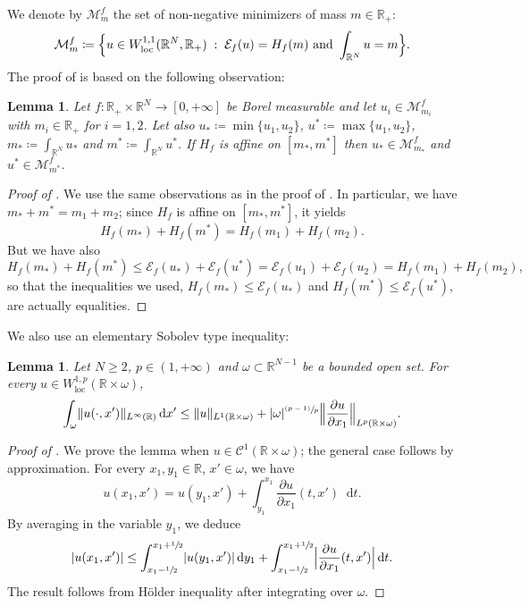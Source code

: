 \documentclass[JEP,XML,SOM,Unicode,published]{cedram}
\newcommand{\psfrac}[2]{{\sfrac{(#1)}{#2}}}
\newcommand{\Babs}[1]{\Bigl\vert#1\Bigr\vert}
\newcommand{\Bnorm}[1]{\Bigl\Vert#1\Bigr\Vert}
\theoremstyle{plain}
\newtheorem{lemma}[theorem]{Lemma}
\theoremstyle{definition}
\newcommand{\dd}{\mathop{}\mathopen{}\mathrm{d}}
\newcommand{\R}{\mathbb{R}}
\newcommand{\Cspace}{\mathscr{C}}
\newcommand{\ener}{\mathcal{E}}
\newcommand{\loc}{\mathrm{loc}}
\newcommand{\st}{\;:\;}
\DeclarePairedDelimiter{\abs}{\lvert}{\rvert}
\DeclarePairedDelimiter{\norm}{\lVert}{\rVert}
\begin{document}
We denote by \(\mathcal{M}^f_m\) the set of non-negative minimizers of mass \(m\in\R_+\):
\begin{equation}
\mathcal{M}^f_m\coloneqq \Bigl\{u\in W^{1,1}_\loc(\R^N,\R_+)\st \ener_f(u)=H_f(m)\text{ and }\int_{\R^N}u=m\Bigr\}.
\end{equation}
The proof of  is based on the following observation:
\begin{lemma}\label{lemmaOptimalitySupInf}
Let \(f:\R_+\times\R^N\to[0,+\infty]\) be Borel measurable and let \(u_i\in\mathcal{M}^f_{m_i}\) with \(m_i\in\R_+\) for \(i=1,2\). Let also \(u_\ast\coloneqq \min\{u_1,u_2\}\), \(u^\ast\coloneqq \max\{u_1,u_2\}\), \(m_\ast\coloneqq \int_{\R^N}u_\ast\) and \(m^\ast\coloneqq \int_{\R^N}u^\ast\). If \(H_f\) is affine on \([m_\ast,m^\ast]\) then \(u_\ast\in\mathcal{M}^f_{m_\ast}\) and \(u^\ast\in\mathcal{M}^f_{m^\ast}\).
\end{lemma}
\begin{proof}[Proof of ]
We use the same observations as in the proof of . In particular, we have \(m_\ast+m^\ast=m_1+m_2\); since \(H_f\) is affine on \([m_\ast,m^\ast]\), it yields
\[
H_f(m_\ast)+H_f(m^\ast)=H_f(m_1)+H_f(m_2).
\]
But we have also
\[
H_f(m_\ast)+H_f(m^\ast)\leq\ener_f(u_\ast)+\ener_f(u^\ast)=\ener_f(u_1)+\ener_f(u_2)=H_f(m_1)+H_f(m_2),
\]
so that the inequalities we used, \ie \(H_f(m_\ast)\leq\ener_f(u_\ast)\) and \(H_f(m^\ast)\leq\ener_f(u^\ast)\), are actually equalities.
\end{proof}
We also use an elementary Sobolev type inequality:
\begin{lemma}\label{lemmaSobolevInfinityLp}
Let \(N\geq 2\), \(p\in (1,+\infty)\) and \(\omega\subset\R^{N-1}\) be a bounded open set. For every \(u\in W_\loc^{1,p}(\R\times\omega)\),
\[
\int_\omega\norm{u(\cdot,x')}_{L^\infty(\R)}\dd x'\leq\norm{u}_{L^1(\R\times\omega)}+\abs{\omega}^{\psfrac{p-1}{p}}
\Bnorm{\frac{\partial u}{\partial x_1}}_{L^p(\R\times\omega)}.
\]
\end{lemma}
\begin{proof}[Proof of ]
We prove the lemma when \(u\in\Cspace^1(\R\times\omega)\); the general case follows by approximation. For every \(x_1,y_1\in\R\), \(x'\in\omega\), we have
\[
u(x_1,x')=u(y_1,x')+\int_{y_1}^{x_1}\frac{\partial u}{\partial x_1}(t,x')\dd t.
\]
By averaging in the variable \(y_1\), we deduce
\[
\abs{u(x_1,x')}\leq \int_{x_1-\sfrac 12}^{x_1+\sfrac 12}\abs{u(y_1,x')}\dd y_1+\int_{x_1-\sfrac 12}^{x_1+\sfrac 12}\Babs{\frac{\partial u}{\partial x_1}(t,x')}\dd t.
\]
The result follows from Hölder inequality after integrating over \(\omega\).
\end{proof}
\end{document}
